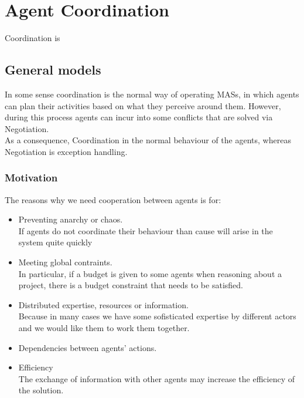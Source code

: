 \chapter{Agent Coordination}
\minitoc

Coordination is 

\section{General models}
In some sense coordination is the normal way of operating MASs, in which agents can plan their activities based on what they perceive around them. However, during this process agents can incur into some conflicts that are solved via Negotiation.\\
As a consequence, Coordination in the normal behaviour of the agents, whereas Negotiation is exception handling.

\subsection{Motivation}
The reasons why we need cooperation between agents is for:
\begin{itemize}
\item Preventing anarchy or chaos.\\
If agents do not coordinate their behaviour than cause will arise in the system quite quickly
\item Meeting global contraints.\\
In particular, if a budget is given to some agents when reasoning about a project, there is a budget constraint that needs to be satisfied.
\item Distributed expertise, resources or information.\\
Because in many cases we have some sofisticated expertise by different actors and we would like them to work them together.
\item Dependencies between agents' actions.
\item Efficiency\\
The exchange of information with other agents may increase the efficiency of the solution.
\end{itemize}

